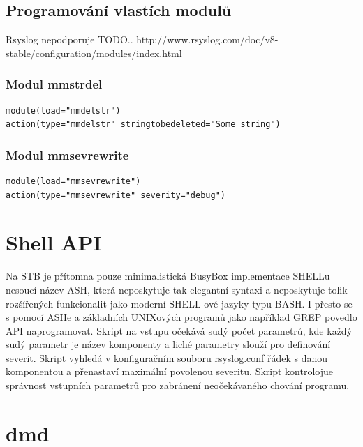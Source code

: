\documentclass[thesis=B,czech]{FITthesis}[2012/06/26]
\begin{document}
\subsection{Programování vlastích modulů}

Rsyslog nepodporuje TODO..
http://www.rsyslog.com/doc/v8-stable/configuration/modules/index.html

\subsubsection{Modul mmstrdel}

\begin{lstlisting}
module(load="mmdelstr") 
action(type="mmdelstr" stringtobedeleted="Some string")
\end{lstlisting}


\subsubsection{Modul mmsevrewrite}

\begin{lstlisting}
module(load="mmsevrewrite")
action(type="mmsevrewrite" severity="debug")
\end{lstlisting}


\section{Shell API}
Na STB je přítomna pouze minimalistická BusyBox implementace SHELLu nesoucí název ASH, která neposkytuje tak elegantní syntaxi a neposkytuje tolik rozšířených funkcionalit jako moderní SHELL-ové jazyky typu BASH. I přesto se s pomocí ASHe a základních UNIXových programů jako například GREP povedlo API naprogramovat.
Skript na vstupu očekává sudý počet parametrů, kde každý sudý parametr je název komponenty a liché parametry slouží pro definování severit.
Skript vyhledá v konfiguračním souboru rsyslog.conf řádek s danou komponentou a přenastaví maximální povolenou severitu. Skript kontrolojue správnost vstupních parametrů pro zabránení neočekávaného chování programu.

\section{dmd}
\end{document}
